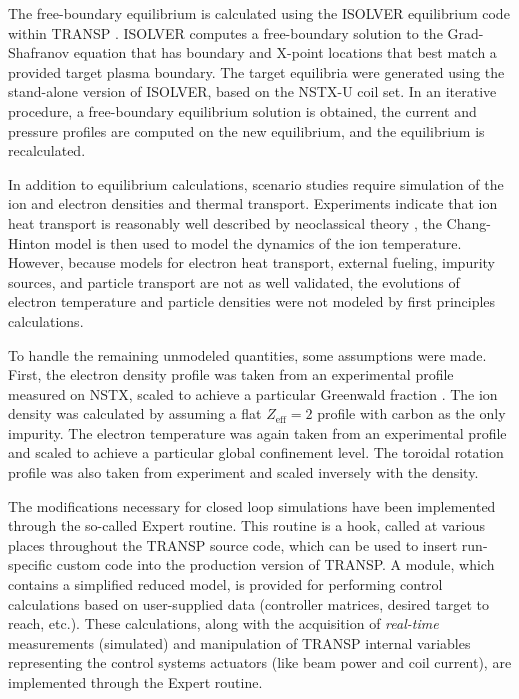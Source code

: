\documentclass[12pt,lot, lof]{puthesis}
\begin{document}
The free-boundary equilibrium is calculated using the ISOLVER equilibrium code within TRANSP \cite{Huang06}. ISOLVER computes a free-boundary solution to the Grad-Shafranov equation that has boundary and X-point locations that best match a provided target plasma boundary. The target equilibria were generated using the stand-alone version of ISOLVER, based on the NSTX-U coil set. In an iterative procedure, a free-boundary equilibrium solution is obtained, the current and pressure profiles are computed on the new equilibrium, and the equilibrium is recalculated.

In addition to equilibrium calculations, scenario studies require simulation of the ion and electron densities and thermal transport. Experiments indicate that ion heat transport is reasonably well described by neoclassical theory \cite{Kaye07, Kaye007,Valovic11}, the Chang-Hinton model \cite{Chang82} is then used to model the dynamics of the ion temperature. However, because models for electron heat transport, external fueling, impurity sources, and particle transport are not as well validated, the evolutions of electron temperature and particle densities were not modeled by first principles calculations.

To handle the remaining unmodeled quantities, some assumptions were made. First, the electron density profile was taken from an experimental profile measured on NSTX, scaled to achieve a particular Greenwald fraction \cite{Greenwald88}. The ion density was calculated by assuming a flat $Z_\text{eff} = 2$ profile with carbon as the only impurity. The electron temperature was again taken from an experimental profile and scaled to achieve a particular global confinement level. The toroidal rotation profile was also taken from experiment and scaled inversely with the density.

The modifications necessary for closed loop simulations have been implemented through the so-called Expert routine. This routine is a hook, called at various places throughout the TRANSP source code, which can be used to insert run- specific custom code into the production version of TRANSP.
A module, which contains a simplified reduced model, is provided for performing control calculations based on user-supplied data (controller matrices, desired target to reach, etc.). These calculations, along with the acquisition of \emph{real-time} measurements (simulated) and manipulation of TRANSP internal variables representing the control systems actuators (like beam power and coil current), are implemented through the Expert routine.
\end{document}
